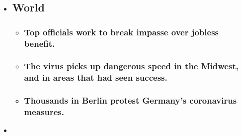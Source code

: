 \begin{itemize}
\item
  \href{https://www.nytimes3xbfgragh.onion/2020/08/01/world/coronavirus-covid-19.html?type=styln-live-updates\&label=world\&index=0}{}

  \hypertarget{world}{%
  \subsection{World}\label{world}}

  \begin{itemize}
  \item
    \href{https://www.nytimes3xbfgragh.onion/2020/08/01/world/coronavirus-covid-19.html?type=styln-live-updates\&label=world\&index=0\#link-3ac56579}{}

    \hypertarget{top-officials-work-to-break-impasse-over-jobless-benefit}{%
    \subsubsection{Top officials work to break impasse over jobless
    benefit.}\label{top-officials-work-to-break-impasse-over-jobless-benefit}}
  \item
    \href{https://www.nytimes3xbfgragh.onion/2020/08/01/world/coronavirus-covid-19.html?type=styln-live-updates\&label=world\&index=0\#link-8796723}{}

    \hypertarget{the-virus-picks-up-dangerous-speed-in-the-midwest-and-in-areas-that-had-seen-success}{%
    \subsubsection{The virus picks up dangerous speed in the Midwest,
    and in areas that had seen
    success.}\label{the-virus-picks-up-dangerous-speed-in-the-midwest-and-in-areas-that-had-seen-success}}
  \item
    \href{https://www.nytimes3xbfgragh.onion/2020/08/01/world/coronavirus-covid-19.html?type=styln-live-updates\&label=world\&index=0\#link-25930521}{}

    \hypertarget{thousands-in-berlin-protest-germanys-coronavirus-measures}{%
    \subsubsection{Thousands in Berlin protest Germany's coronavirus
    measures.}\label{thousands-in-berlin-protest-germanys-coronavirus-measures}}
  \end{itemize}
\item
  \href{https://www.nytimes3xbfgragh.onion/live/2020/07/31/business/stock-market-today-coronavirus?type=styln-live-updates\&label=business\&index=1}{}


\end{itemize}
